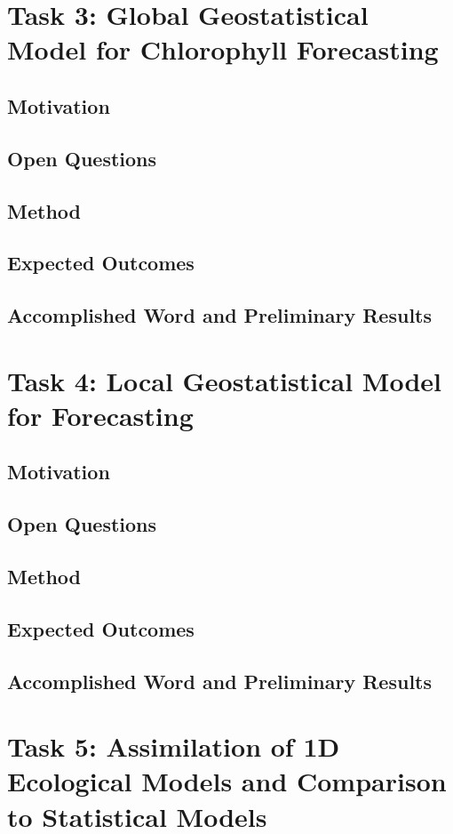 \section{Task 3: Global Geostatistical Model for Chlorophyll Forecasting}

\subsection{Motivation}
\subsection{Open Questions}
\subsection{Method}
\subsection{Expected Outcomes}
\subsection{Accomplished Word and Preliminary Results}

\section{Task 4: Local Geostatistical Model for Forecasting}

\subsection{Motivation}
\subsection{Open Questions}
\subsection{Method}
\subsection{Expected Outcomes}
\subsection{Accomplished Word and Preliminary Results}

\section{Task 5: Assimilation of 1D Ecological Models and Comparison to 
Statistical Models}

